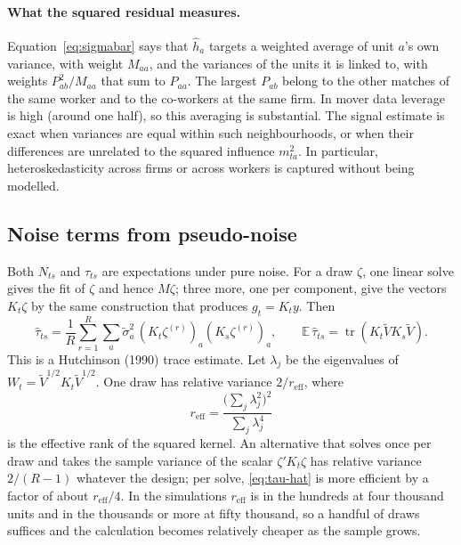 \documentclass[11pt]{article}
\newcommand{\E}{\mathbb{E}}
\newcommand{\tr}{\operatorname{tr}}
\newcommand{\reff}{r_{\mathrm{eff}}}
\begin{document}
\paragraph{What the squared residual measures.} Equation~\eqref{eq:sigmabar}
says that $\hat h_a$ targets a weighted average of unit $a$'s own variance,
with weight $M_{aa}$, and the variances of the units it is linked to, with
weights $P_{ab}^2/M_{aa}$ that sum to $P_{aa}$. The largest $P_{ab}$ belong to
the other matches of the same worker and to the co-workers at the same firm.
In mover data leverage is high (around one half), so this averaging is
substantial. The signal estimate is exact when variances are equal within
such neighbourhoods, or when their differences are unrelated to the squared
influence $m_{ta}^2$. In particular, heteroskedasticity across firms or
across workers is captured without being modelled.

\subsection{Noise terms from pseudo-noise}\label{sec:noise}

Both $N_{ts}$ and $\tau_{ts}$ are expectations under pure noise. For a draw
$\zeta$, one linear solve gives the fit of $\zeta$ and hence $M\zeta$; three
more, one per component, give the vectors $K_t\zeta$ by the same construction
that produces $g_t=K_ty$. Then
\begin{equation}\label{eq:tau-hat}
 \hat\tau_{ts}=\frac1R\sum_{r=1}^R\sum_a\tilde\sigma_a^2\,
 (K_t\zeta^{(r)})_a(K_s\zeta^{(r)})_a,\qquad
 \E\,\hat\tau_{ts}=\tr(K_t\tilde VK_s\tilde V).
\end{equation}
This is a Hutchinson (1990) trace estimate. Let $\lambda_j$ be the
eigenvalues of $W_t=\tilde V^{1/2}K_t\tilde V^{1/2}$. One draw has relative
variance $2/\reff$, where
\begin{equation}\label{eq:reff}
 \reff=\frac{\bigl(\sum_j\lambda_j^2\bigr)^2}{\sum_j\lambda_j^4}
\end{equation}
is the effective rank of the squared kernel. An alternative that solves once
per draw and takes the sample variance of the scalar $\zeta'K_t\zeta$ has
relative variance $2/(R-1)$ whatever the design; per solve, \eqref{eq:tau-hat}
is more efficient by a factor of about $\reff/4$. In the simulations $\reff$
is in the hundreds at four thousand units and in the thousands or more at
fifty thousand, so a handful of draws suffices and the calculation becomes
relatively cheaper as the sample grows.
\end{document}
